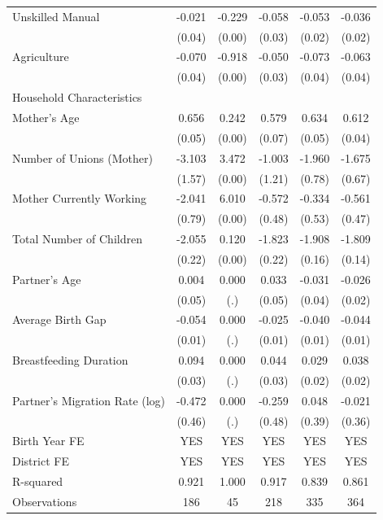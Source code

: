 \begin{longtable}{l*{5}{c}}
\hspace{1em}Unskilled Manual & -0.021 & -0.229\sym{***} & -0.058\sym{**} & -0.053\sym{**} & -0.036\sym{*} \\
                    & (0.04) & (0.00) & (0.03) & (0.02) & (0.02) \\
\hspace{1em}Agriculture & -0.070\sym{*} & -0.918\sym{***} & -0.050 & -0.073\sym{*} & -0.063\sym{*} \\
                    & (0.04) & (0.00) & (0.03) & (0.04) & (0.04) \\
\multicolumn{6}{l}{Household Characteristics} \\
Mother's Age & 0.656\sym{***} & 0.242\sym{***} & 0.579\sym{***} & 0.634\sym{***} & 0.612\sym{***} \\
                    & (0.05) & (0.00) & (0.07) & (0.05) & (0.04) \\
Number of Unions (Mother) & -3.103\sym{*} & 3.472\sym{***} & -1.003 & -1.960\sym{**} & -1.675\sym{**} \\
                    & (1.57) & (0.00) & (1.21) & (0.78) & (0.67) \\
Mother Currently Working & -2.041\sym{**} & 6.010\sym{***} & -0.572 & -0.334 & -0.561 \\
                    & (0.79) & (0.00) & (0.48) & (0.53) & (0.47) \\
Total Number of Children & -2.055\sym{***} & 0.120\sym{***} & -1.823\sym{***} & -1.908\sym{***} & -1.809\sym{***} \\
                    & (0.22) & (0.00) & (0.22) & (0.16) & (0.14) \\
Partner's Age & 0.004 & 0.000 & 0.033 & -0.031 & -0.026 \\
                    & (0.05) & (.) & (0.05) & (0.04) & (0.02) \\
Average Birth Gap & -0.054\sym{***} & 0.000 & -0.025\sym{**} & -0.040\sym{***} & -0.044\sym{***} \\
                    & (0.01) & (.) & (0.01) & (0.01) & (0.01) \\
Breastfeeding Duration & 0.094\sym{***} & 0.000 & 0.044 & 0.029 & 0.038\sym{*} \\
                    & (0.03) & (.) & (0.03) & (0.02) & (0.02) \\
Partner's Migration Rate (log) & -0.472 & 0.000 & -0.259 & 0.048 & -0.021 \\
                    & (0.46) & (.) & (0.48) & (0.39) & (0.36) \\
\hline
Birth Year FE & YES & YES & YES & YES & YES \\
District FE & YES & YES & YES & YES & YES \\
R-squared & 0.921 & 1.000 & 0.917 & 0.839 & 0.861 \\
Observations & 186 & 45 & 218 & 335 & 364 \\
\hline \hline

\end{longtable}